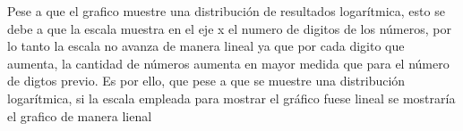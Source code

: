 Pese a que el grafico muestre una distribución de resultados logarítmica, esto se debe a que la escala muestra en el eje x el numero de digitos de los números, por lo tanto la escala no avanza de manera lineal ya que por cada digito que aumenta, la cantidad de números aumenta en mayor medida que para el número de digtos previo. Es por ello, que pese a que se muestre una distribución logarítmica, si la escala empleada para mostrar el gráfico fuese lineal se mostraría el grafico de manera lienal

\begin{figure}[H]
\end{figure}

\newpage